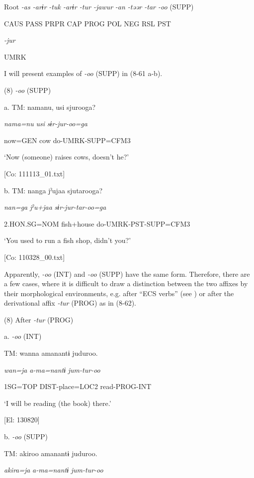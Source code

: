   Root  \textit{{}-as  {}-arɨr} %
\textit{{}-tuk  {}-arɨr  {}-tur  {}-jawur} %
\textit{{}-an  {}-təər  {}-tar  {}-oo} (SUPP)

    CAUS  PASS  PRPR  CAP  PROG  POL  NEG  RSL  PST  

          \textit{{}-jur} 

          UMRK    

I will present examples of \textit{{}-oo} (SUPP) in (8-61 a-b).

(8)  \textit{{}-oo} (SUPP)

  a.  TM:  namanu,  usi  sjurooga?

      \textit{nama=nu}  \textit{usi}  \textit{sɨr-jur-oo=ga}

      now=GEN  cow  do-UMRK-SUPP=CFM3

      ‘Now (someone) raises cows, doesn’t he?’

      [Co: 111113\_01.txt]

  b.  TM:  nanga  jˀujaa  sjutarooga?

      \textit{nan=ga}  \textit{jˀu+jaa}  \textit{sɨr-jur-tar-oo=ga}

      2.HON.SG=NOM  fish+house  do-UMRK-PST-SUPP=CFM3

      ‘You used to run a fish shop, didn’t you?’

      [Co: 110328\_00.txt]

  Apparently, \textit{-oo} (INT) and \textit{{}-oo} (SUPP) have the same form. Therefore, there are a few cases, where it is difficult to draw a distinction between the two affixes by their morphological environments, e.g. after “ECS verbs” (see ) or after the derivational affix \textit{{}-tur} (PROG) as in (8-62).

(8)  After \textit{{}-tur} (PROG)

  a.  \textit{{}-oo} (INT)

    TM:  wanna  amanantɨ  juduroo.

      \textit{wan=ja}  \textit{a-ma=nantɨ}  \textit{jum-tur-oo}

      1SG=TOP  DIST-place=LOC2  read-PROG-INT

      ‘I will be reading (the book) there.’

      [El: 130820]

  b.  \textit{{}-oo} (SUPP)

    TM:  akiroo  amanantɨ  juduroo.

      \textit{akira=ja}  \textit{a-ma=nantɨ}  \textit{jum-tur-oo}

